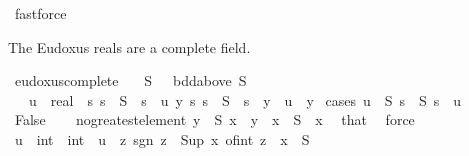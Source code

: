 \begin{isabellebody}
\ fastforce\isanewline
{}\isamarkupfalse%
%
\endisatagproof
{\isafoldproof}%
%
\isadelimproof
%
\endisadelimproof
%
\begin{isamarkuptext}%
The Eudoxus reals are a complete field.%
\end{isamarkuptext}\isamarkuptrue%
\isamarkupfalse%
\ eudoxus{\isacharunderscore}{\kern0pt}complete{\isacharcolon}{\kern0pt}\isanewline
\ \ \ {\isachardoublequoteopen}S\ {\isasymnoteq}\ {\isacharbraceleft}{\kern0pt}{\isacharbraceright}{\kern0pt}{\isachardoublequoteclose}\ {\isachardoublequoteopen}bdd{\isacharunderscore}{\kern0pt}above\ S{\isachardoublequoteclose}\isanewline
\ \ \ u\ {\isacharcolon}{\kern0pt}{\isacharcolon}{\kern0pt}\ real\ \ {\isachardoublequoteopen}{\isasymAnd}s{\isachardot}{\kern0pt}\ s\ {\isasymin}\ S\ {\isasymLongrightarrow}\ s\ {\isasymle}\ u{\isachardoublequoteclose}\ {\isachardoublequoteopen}{\isasymAnd}y{\isachardot}{\kern0pt}\ {\isacharparenleft}{\kern0pt}{\isasymAnd}s{\isachardot}{\kern0pt}\ s\ {\isasymin}\ S\ {\isasymLongrightarrow}\ s\ {\isasymle}\ y{\isacharparenright}{\kern0pt}\ {\isasymLongrightarrow}\ u\ {\isasymle}\ y{\isachardoublequoteclose}\isanewline
%
\isadelimproof
%
\endisadelimproof
%
\isatagproof
{}\isamarkupfalse%
\ {\isacharparenleft}{\kern0pt}cases\ {\isachardoublequoteopen}{\isasymexists}u\ {\isasymin}\ S{\isachardot}{\kern0pt}\ {\isasymforall}s\ {\isasymin}\ S{\isachardot}{\kern0pt}\ s\ {\isasymle}\ u{\isachardoublequoteclose}{\isacharparenright}{\kern0pt}\isanewline
\ \ \isamarkupfalse%
\ False\isanewline
\ \ \isamarkupfalse%
\ no{\isacharunderscore}{\kern0pt}greatest{\isacharunderscore}{\kern0pt}element{\isacharcolon}{\kern0pt}\ {\isachardoublequoteopen}{\isasymexists}y\ {\isasymin}\ S{\isachardot}{\kern0pt}\ x\ {\isacharless}{\kern0pt}\ y{\isachardoublequoteclose}\ \ {\isachardoublequoteopen}x\ {\isasymin}\ S{\isachardoublequoteclose}\ \ x\ \isamarkupfalse%
\ that\ \isamarkupfalse%
\ force\isanewline
\ \ \isamarkupfalse%
\ u\ {\isacharcolon}{\kern0pt}{\isacharcolon}{\kern0pt}\ {\isachardoublequoteopen}int\ {\isasymRightarrow}\ int{\isachardoublequoteclose}\ \ {\isachardoublequoteopen}u\ {\isacharequal}{\kern0pt}\ {\isacharparenleft}{\kern0pt}{\isasymlambda}z{\isachardot}{\kern0pt}\ sgn\ z\ {\isacharasterisk}{\kern0pt}\ Sup\ {\isacharparenleft}{\kern0pt}{\isacharparenleft}{\kern0pt}{\isasymlambda}x{\isachardot}{\kern0pt}\ {\isasymlfloor}of{\isacharunderscore}{\kern0pt}int\ {\isasymbar}z{\isasymbar}\ {\isacharasterisk}{\kern0pt}\ x{\isasymrfloor}{\isacharparenright}{\kern0pt}\ {\isacharbackquote}{\kern0pt}\ S{\isacharparenright}{\kern0pt}{\isacharparenright}{\kern0pt}{\isachardoublequoteclose}\isanewline

\end{isabellebody}
